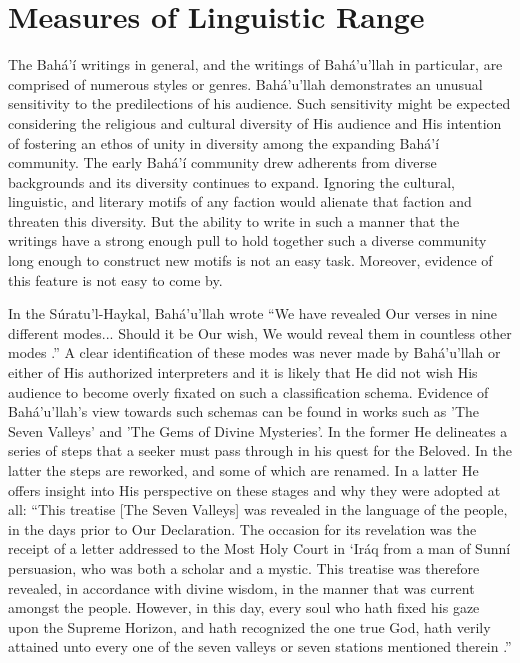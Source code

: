 \documentclass[12pt, oneside]{report}
\begin{document}
\section{Measures of Linguistic Range}
\par
The Bah\'{a}'\'{i} writings in general, and the writings of Bah\'{a}'u'llah in particular, are comprised of numerous styles or genres.
Bah\'{a}'u'llah demonstrates an unusual sensitivity to the predilections of his audience.
Such sensitivity might be expected considering the religious and cultural diversity of His audience and His intention of fostering an ethos of unity in diversity among the expanding Bah\'{a}'\'{i} community.
The early Bah\'{a}'\'{i} community drew adherents from diverse backgrounds and its diversity continues to expand.
Ignoring the cultural, linguistic, and literary motifs of any faction would alienate that faction and threaten this diversity.
But the ability to write in such a manner that the writings have a strong enough pull to hold together such a diverse community long enough to construct new motifs is not an easy task.
Moreover, evidence of this feature is not easy to come by.
\par
In the S\'{u}ratu'l-Haykal, Bah\'{a}'u'llah wrote ``We have revealed Our verses in nine different modes... Should it be Our wish, We would reveal them in countless other modes \cite{bahaullah_summons_nodate}.''
A clear identification of these modes was never made by Bah\'{a}'u'llah or either of His authorized interpreters and it is likely that He did not wish His audience to become overly fixated on such a classification schema.
Evidence of Bah\'{a}'u'llah's view towards such schemas can be found in works such as 'The Seven Valleys' and 'The Gems of Divine Mysteries'.
In the former He delineates a series of steps that a seeker must pass through in his quest for the Beloved.
In the latter the steps are reworked, and some of which are renamed.
In a latter He offers insight into His perspective on these stages and why they were adopted at all: ``This treatise [The Seven Valleys] was revealed in the language of the people, in the days prior to Our Declaration. The occasion for its revelation was the receipt of a letter addressed to the Most Holy Court in ‘Iráq from a man of Sunní persuasion, who was both a scholar and a mystic. This treatise was therefore revealed, in accordance with divine wisdom, in the manner that was current amongst the people. However, in this day, every soul who hath fixed his gaze upon the Supreme Horizon, and hath recognized the one true God, hath verily attained unto every one of the seven valleys or seven stations mentioned therein \cite{bahaullah_call_nodate}.''
\end{document}
